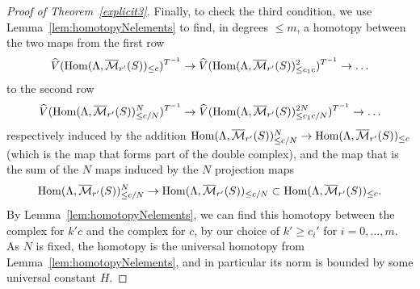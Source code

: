 \begin{proof}[Proof of Theorem~\ref{explicit3}]
Finally, to check the third condition, we use Lemma~\ref{lem:homotopyNelements} to find, in degrees $\leq m$, a homotopy between the two maps from the first row
\[
\widehat{V}(\operatorname{Hom}(\Lambda,\overline{\mathcal M}_{r'}(S))_{\leq c})^{T^{-1}}\to \widehat{V}(\operatorname{Hom}(\Lambda,\overline{\mathcal M}_{r'}(S))_{\leq c_1c}^2)^{T^{-1}}\to \ldots
\]
to the second row
\[
\widehat{V}(\operatorname{Hom}(\Lambda,\overline{\mathcal M}_{r'}(S))_{\leq c/N}^N)^{T^{-1}}\to \widehat{V}(\operatorname{Hom}(\Lambda,\overline{\mathcal M}_{r'}(S))_{\leq c_1c/N}^{2N})^{T^{-1}}\to \ldots
\]
respectively induced by the addition $\operatorname{Hom}(\Lambda,\overline{\mathcal M}_{r'}(S))_{\leq c/N}^N\to \operatorname{Hom}(\Lambda,\overline{\mathcal M}_{r'}(S))_{\leq c}$ (which is the map that forms part of the double complex), and the map that is the sum of the $N$ maps induced by the $N$ projection maps
\[
\operatorname{Hom}(\Lambda,\overline{\mathcal M}_{r'}(S))_{\leq c/N}^N\to \operatorname{Hom}(\Lambda,\overline{\mathcal M}_{r'}(S))_{\leq c/N}\subset \operatorname{Hom}(\Lambda,\overline{\mathcal M}_{r'}(S))_{\leq c}.
\]
By Lemma~\ref{lem:homotopyNelements}, we can find this homotopy between the complex for $k'c$ and the complex for $c$, by our choice of $k'\geq c_i'$ for $i=0,\ldots,m$. As $N$ is fixed, the homotopy is the universal homotopy from Lemma~\ref{lem:homotopyNelements}, and in particular its norm is bounded by some universal constant $H$.


\end{proof}

